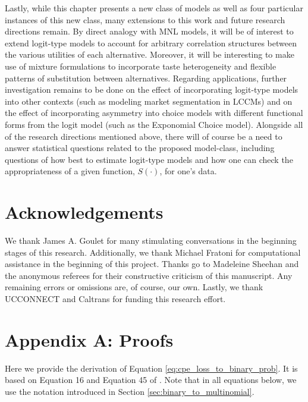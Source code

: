 Lastly, while this chapter presents a new class of models as well as four particular instances of this new class, many extensions to this work and future research directions remain. By direct analogy with MNL models, it will be of interest to extend logit-type models to account for arbitrary correlation structures between the various utilities of each alternative. Moreover, it will be interesting to make use of mixture formulations to incorporate taste heterogeneity and flexible patterns of substitution between alternatives. Regarding applications, further investigation remains to be done on the effect of incorporating logit-type models into other contexts (such as modeling market segmentation in LCCMs) and on the effect of incorporating asymmetry into choice models with different functional forms from the logit model (such as the Exponomial Choice model). Alongside all of the research directions mentioned above, there will of course be a need to answer statistical questions related to the proposed model-class, including questions of how best to estimate logit-type models and how one can check the appropriateness of a given function, $S \left( \cdot \right)$, for one's data.

\section*{Acknowledgements}
We thank James A. Goulet for many stimulating conversations in the beginning stages of this research. Additionally, we thank Michael Fratoni for computational assistance in the beginning of this project. Thanks go to Madeleine Sheehan and the anonymous referees for their constructive criticism of this manuscript. Any remaining errors or omissions are, of course, our own. Lastly, we thank UCCONNECT and Caltrans for funding this research effort.

\newpage
\section{Appendix A: Proofs}
\label{appendix:proofs}
Here we provide the derivation of Equation \ref{eq:cpe_loss_to_binary_prob}. It is based on Equation 16 and Equation 45 of \citet{buja_loss_2005}. Note that in all equations below, we use the notation introduced in Section \ref{sec:binary_to_multinomial}.

